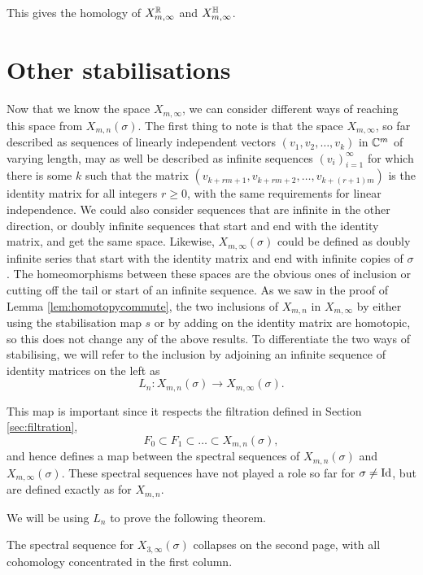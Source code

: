 This gives the homology of $X_{m,\infty}^{\mathbb{R}}$ and
$X_{m,\infty}^{\mathbb{H}}$.


\section{Other stabilisations}
\label{sec:stabilitet}

Now that we know the space $X_{m,\infty}$, we can consider different
ways of reaching this space from $X_{m,n}(\sigma)$. The
first thing to note is that the space $X_{m,\infty}$, so far described
as sequences of linearly independent vectors $(v_1,v_2,\dots,v_k)$ in
$\mathbb{C}^m$ of varying length, may as well be described as infinite
sequences $(v_i)_{i=1}^\infty$ for which there is some $k$ such that
the matrix $(v_{k+rm +1},v_{k+rm +2},\dots,v_{k+(r+1)m})$ is the
identity matrix for all integers $r \geq 0$, with the same
requirements for
linear independence. We could also consider sequences that are
infinite in the other direction, or
doubly infinite sequences
that start and end with the identity matrix,
and get the same space. Likewise, $X_{m,\infty}(\sigma)$ could be
defined as doubly infinite series that start with the identity matrix
and end with infinite copies of $\sigma$. The homeomorphisms between
these spaces are the obvious ones of inclusion or cutting off the tail
or start of an infinite sequence. As we saw in the proof of Lemma
\ref{lem:homotopycommute}, the two inclusions of $X_{m,n}$ in
$X_{m,\infty}$ by either
using the stabilisation map $s$ or by adding on the identity matrix
are homotopic, so this does not change any of the above results. To
differentiate the two ways of stabilising, we will refer to the
inclusion by adjoining an
infinite sequence of identity matrices on the left as
\[ L_n : X_{m,n}(\sigma) \to X_{m,\infty}(\sigma). \]

This map is important since it respects the
filtration defined in Section \ref{sec:filtration},
\[ F_0 \subset F_1 \subset \dots \subset X_{m,n}(\sigma), \]
and hence defines a map between the spectral sequences of
$X_{m,n}(\sigma)$ and $X_{m,\infty}(\sigma)$. These spectral sequences
have not played a role so far for $\sigma\neq \operatorname{Id}$, but are defined
exactly as for $X_{m,n}$.

We will be using $L_n$ to prove the following theorem.
\begin{theorem}
  \label{thm:kollaps}
  The spectral sequence for $X_{3,\infty}(\sigma)$ collapses on the
  second page, with all cohomology concentrated in the first column.
\end{theorem}

